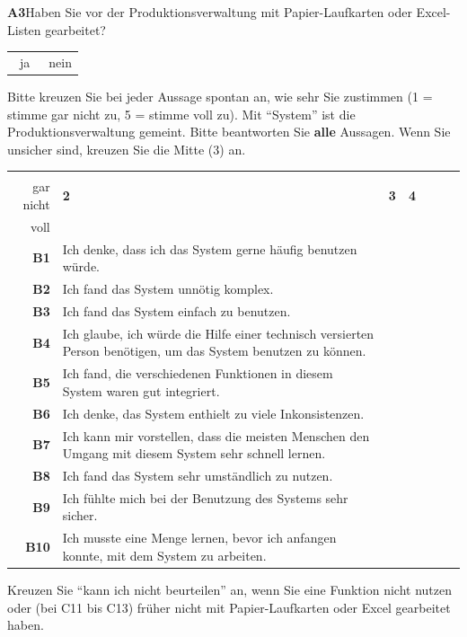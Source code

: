\documentclass[11pt,a4paper]{article}
\newcommand{\kasten}{\raisebox{-0.2ex}{\scalebox{1.5}{$\square$}}}
\newcommand{\teil}[1]{\par\vspace{0.5em}{\large\bfseries #1}\par}
\newcommand{\eins}{\makebox[0pt]{\shortstack{\bfseries 1\\[-0.1em]\scriptsize gar nicht}}}
\newcommand{\fuenf}{\makebox[0pt]{\shortstack{\bfseries 5\\[-0.1em]\scriptsize voll}}}
\newcommand{\zeile}[2]{\bfseries #1 & #2 & \kasten & \kasten & \kasten & \kasten & \kasten \\}
\begin{document}
\textbf{A3}\enspace Haben Sie vor der Produktionsverwaltung mit Papier-Laufkarten oder Excel-Listen gearbeitet?

\begin{tabular}{@{\hspace{1.8em}}l@{\hspace{2em}}l}
	\kasten\ ja & \kasten\ nein
\end{tabular}

\teil{Teil B: Bedienung allgemein}

Bitte kreuzen Sie bei jeder Aussage spontan an, wie sehr Sie zustimmen (1 = stimme gar nicht zu,
5 = stimme voll zu). Mit \enquote{System} ist die Produktionsverwaltung gemeint. Bitte beantworten
Sie \textbf{alle} Aussagen. Wenn Sie unsicher sind, kreuzen Sie die Mitte (3) an.

{\renewcommand{\arraystretch}{1.55}
\begin{tabularx}{\linewidth}{@{}N@{\hspace{0.6em}}AKKKKK@{}}
	& & \eins & \bfseries 2 & \bfseries 3 & \bfseries 4 & \fuenf \\
	\zeile{B1}{Ich denke, dass ich das System gerne häufig benutzen würde.}
	\zeile{B2}{Ich fand das System unnötig komplex.}
	\zeile{B3}{Ich fand das System einfach zu benutzen.}
	\zeile{B4}{Ich glaube, ich würde die Hilfe einer technisch versierten Person benötigen, um das System benutzen zu können.}
	\zeile{B5}{Ich fand, die verschiedenen Funktionen in diesem System waren gut integriert.}
	\zeile{B6}{Ich denke, das System enthielt zu viele Inkonsistenzen.}
	\zeile{B7}{Ich kann mir vorstellen, dass die meisten Menschen den Umgang mit diesem System sehr schnell lernen.}
	\zeile{B8}{Ich fand das System sehr umständlich zu nutzen.}
	\zeile{B9}{Ich fühlte mich bei der Benutzung des Systems sehr sicher.}
	\zeile{B10}{Ich musste eine Menge lernen, bevor ich anfangen konnte, mit dem System zu arbeiten.}
\end{tabularx}}

\newpage
\teil{Teil C: Einzelne Funktionen und Vergleich mit früher}

Kreuzen Sie \enquote{kann ich nicht beurteilen} an, wenn Sie eine Funktion nicht nutzen oder
(bei C11 bis C13) früher nicht mit Papier-Laufkarten oder Excel gearbeitet haben.
\end{document}

